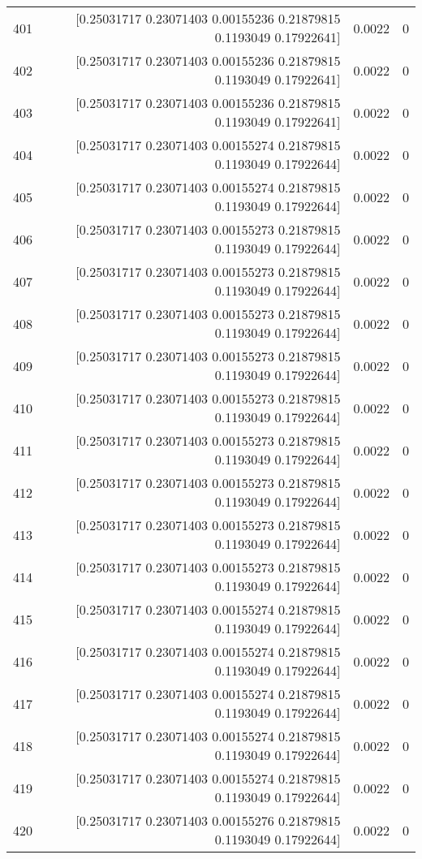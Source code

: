 \begin{longtable}{lrrr}
401 & [0.25031717 0.23071403 0.00155236 0.21879815 0.1193049  0.17922641] & 0.0022 & 0 \\
402 & [0.25031717 0.23071403 0.00155236 0.21879815 0.1193049  0.17922641] & 0.0022 & 0 \\
403 & [0.25031717 0.23071403 0.00155236 0.21879815 0.1193049  0.17922641] & 0.0022 & 0 \\
404 & [0.25031717 0.23071403 0.00155274 0.21879815 0.1193049  0.17922644] & 0.0022 & 0 \\
405 & [0.25031717 0.23071403 0.00155274 0.21879815 0.1193049  0.17922644] & 0.0022 & 0 \\
406 & [0.25031717 0.23071403 0.00155273 0.21879815 0.1193049  0.17922644] & 0.0022 & 0 \\
407 & [0.25031717 0.23071403 0.00155273 0.21879815 0.1193049  0.17922644] & 0.0022 & 0 \\
408 & [0.25031717 0.23071403 0.00155273 0.21879815 0.1193049  0.17922644] & 0.0022 & 0 \\
409 & [0.25031717 0.23071403 0.00155273 0.21879815 0.1193049  0.17922644] & 0.0022 & 0 \\
410 & [0.25031717 0.23071403 0.00155273 0.21879815 0.1193049  0.17922644] & 0.0022 & 0 \\
411 & [0.25031717 0.23071403 0.00155273 0.21879815 0.1193049  0.17922644] & 0.0022 & 0 \\
412 & [0.25031717 0.23071403 0.00155273 0.21879815 0.1193049  0.17922644] & 0.0022 & 0 \\
413 & [0.25031717 0.23071403 0.00155273 0.21879815 0.1193049  0.17922644] & 0.0022 & 0 \\
414 & [0.25031717 0.23071403 0.00155273 0.21879815 0.1193049  0.17922644] & 0.0022 & 0 \\
415 & [0.25031717 0.23071403 0.00155274 0.21879815 0.1193049  0.17922644] & 0.0022 & 0 \\
416 & [0.25031717 0.23071403 0.00155274 0.21879815 0.1193049  0.17922644] & 0.0022 & 0 \\
417 & [0.25031717 0.23071403 0.00155274 0.21879815 0.1193049  0.17922644] & 0.0022 & 0 \\
418 & [0.25031717 0.23071403 0.00155274 0.21879815 0.1193049  0.17922644] & 0.0022 & 0 \\
419 & [0.25031717 0.23071403 0.00155274 0.21879815 0.1193049  0.17922644] & 0.0022 & 0 \\
420 & [0.25031717 0.23071403 0.00155276 0.21879815 0.1193049  0.17922644] & 0.0022 & 0 \\

\end{longtable}
